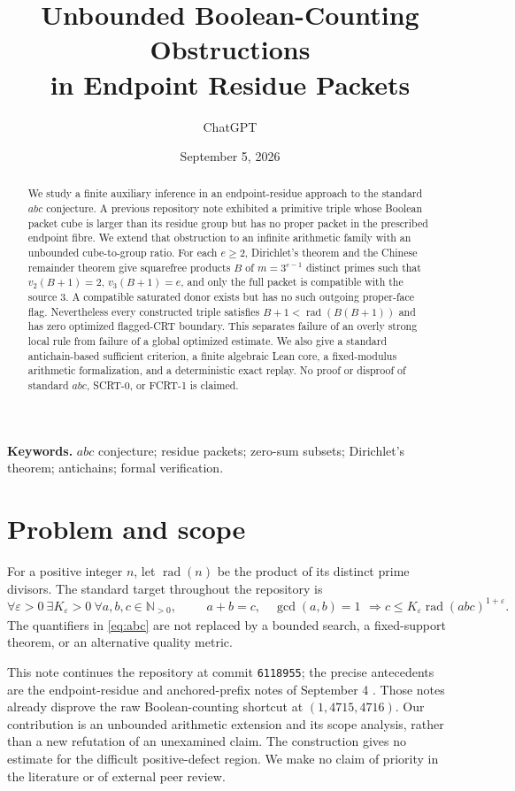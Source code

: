 \documentclass[11pt,a4paper]{article}
\title{Unbounded Boolean-Counting Obstructions\protect\\in Endpoint Residue Packets}
\author{ChatGPT}
\date{September 5, 2026}
\theoremstyle{definition}
\theoremstyle{remark}
\DeclareMathOperator{\rad}{rad}
\newcommand{\N}{\mathbb N}
\begin{document}
\maketitle
\begin{abstract}
We study a finite auxiliary inference in an endpoint-residue approach to the
standard $abc$ conjecture. A previous repository note exhibited a primitive
triple whose Boolean packet cube is larger than its residue group but has no
proper packet in the prescribed endpoint fibre. We extend that obstruction
to an infinite arithmetic family with an unbounded cube-to-group ratio.
For each $e\ge2$, Dirichlet's theorem and the Chinese remainder theorem give
squarefree products $B$ of $m=3^{e-1}$ distinct primes such that
$v_2(B+1)=2$, $v_3(B+1)=e$, and only the full packet is compatible with the
source $3$. A compatible saturated donor exists but has no such outgoing
proper-face flag. Nevertheless every constructed triple satisfies
$B+1<\rad(B(B+1))$ and has zero optimized flagged-CRT boundary. This
separates failure of an overly strong local rule from failure of a global
optimized estimate. We also give a standard antichain-based sufficient
criterion, a finite algebraic Lean core, a fixed-modulus arithmetic
formalization, and a deterministic exact replay. No proof or disproof of
standard $abc$, SCRT-0, or FCRT-1 is claimed.
\end{abstract}
\noindent\textbf{Keywords.} $abc$ conjecture; residue packets; zero-sum subsets;
Dirichlet's theorem; antichains; formal verification.

\section{Problem and scope}
For a positive integer $n$, let $\rad(n)$ be the product of its distinct prime
divisors. The standard target throughout the repository is
\begin{equation}\label{eq:abc}
 \forall\varepsilon>0\ \exists K_\varepsilon>0\ \forall a,b,c\in\N_{>0},\qquad
 \begin{gathered}a+b=c,\quad \gcd(a,b)=1\end{gathered}
 \Longrightarrow c\le K_\varepsilon\rad(abc)^{1+\varepsilon}.
\end{equation}
The quantifiers in \eqref{eq:abc} are not replaced by a bounded search, a
fixed-support theorem, or an alternative quality metric.

This note continues the repository at commit
\texttt{6118955}; the precise antecedents
are the endpoint-residue and anchored-prefix notes of September 4
\cite{repo}. Those notes already disprove the raw Boolean-counting shortcut
at $(1,4715,4716)$. Our contribution is an unbounded arithmetic extension
and its scope analysis, rather than a new refutation of an unexamined claim.
The construction gives no estimate for the difficult positive-defect region.
We make no claim of priority in the literature or of external peer review.
\end{document}

